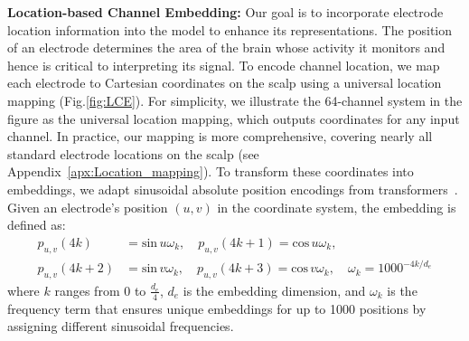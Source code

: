 \documentclass{article} %
\begin{document}
\textbf{Location-based Channel Embedding:} 
Our goal is to incorporate electrode location information into the model to enhance its representations. The position of an electrode determines the area of the brain whose activity it monitors and hence is critical to interpreting its signal. To encode channel location, we map each electrode to Cartesian coordinates on the scalp using a universal location mapping (Fig.\ref{fig:LCE}). For simplicity, we illustrate the 64-channel system in the figure as the universal location mapping, which outputs coordinates for any input channel. In practice, our mapping is more comprehensive, covering nearly all standard electrode locations on the scalp (see Appendix~\ref{apx:Location_mapping}). To transform these coordinates into embeddings, we adapt sinusoidal absolute position encodings from transformers~\citep{attention2017,ConvTran2023}. Given an electrode's position $(u, v)$ in the coordinate system, the embedding is defined as: 
\begin{equation}
\begin{aligned}
    p_{u,v}(4k) &= \mathrm{sin}\, u\omega_k, \quad 
    p_{u,v}(4k+1) = \mathrm{cos}\, u\omega_k, \\
    p_{u,v}(4k+2) &= \mathrm{sin}\, v\omega_k, \quad 
    p_{u,v}(4k+3) = \mathrm{cos}\, v\omega_k, \quad \omega_k= 1000^{-4k/d_{e}}
\end{aligned}
\label{eq:apeV}
\end{equation}
where $k$ ranges from $0$ to $\frac{d_{e}}{4}$, $d_{e}$ is the embedding dimension, and $\omega_k$ is the frequency term that ensures unique embeddings for up to 1000 positions by assigning different sinusoidal frequencies. 
\end{document}
